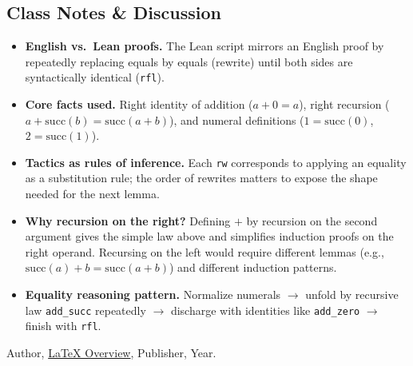 \documentclass{article}
\theoremstyle{theorem}
\theoremstyle{definition}
\theoremstyle{remark}
\begin{document}
\subsection{Class Notes \& Discussion}
\begin{itemize}
  \item \textbf{English vs.\ Lean proofs.} The Lean script mirrors an English proof by repeatedly replacing equals by equals (rewrite) until both sides are syntactically identical (\texttt{rfl}).
  \item \textbf{Core facts used.} Right identity of addition ($a+0=a$), right recursion ($a+\mathrm{succ}(b)=\mathrm{succ}(a+b)$), and numeral definitions ($1=\mathrm{succ}(0)$, $2=\mathrm{succ}(1)$).
  \item \textbf{Tactics as rules of inference.} Each \texttt{rw} corresponds to applying an equality as a substitution rule; the order of rewrites matters to expose the shape needed for the next lemma.
  \item \textbf{Why recursion on the right?} Defining $+$ by recursion on the second argument gives the simple law above and simplifies induction proofs on the right operand. Recursing on the left would require different lemmas (e.g., $\mathrm{succ}(a)+b=\mathrm{succ}(a+b)$) and different induction patterns.
  \item \textbf{Equality reasoning pattern.} Normalize numerals $\to$ unfold by recursive law \texttt{add\_succ} repeatedly $\to$ discharge with identities like \texttt{add\_zero} $\to$ finish with \texttt{rfl}.
\end{itemize}

\begin{thebibliography}{99}
 Author, \href{https://en.wikipedia.org/wiki/LaTeX}{LaTeX Overview}, Publisher, Year.
\end{thebibliography}
\end{document}
